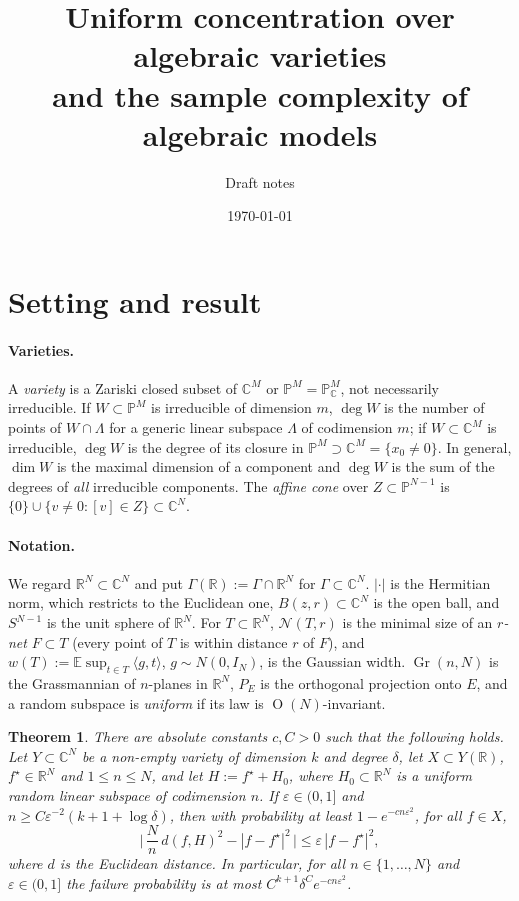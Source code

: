 \documentclass[11pt]{article}
\title{Uniform concentration over algebraic varieties\\ and the sample complexity of algebraic models}
\author{Draft notes}
\date{\today}
\newtheorem{theorem}{Theorem}[section]
\newcommand{\R}{\mathbb{R}}
\newcommand{\C}{\mathbb{C}}
\newcommand{\PP}{\mathbb{P}}
\newcommand{\E}{\mathbb{E}}
\newcommand{\eps}{\varepsilon}
\newcommand{\fs}{f^{\star}}
\newcommand{\cN}{\mathcal{N}}
\DeclareMathOperator{\Gr}{Gr}
\DeclareMathOperator{\Ort}{O}
\begin{document}
\maketitle

\section{Setting and result}

\paragraph{Varieties.} A \emph{variety} is a Zariski closed subset of $\C^M$ or $\PP^M=\PP^M_\C$, not necessarily irreducible. If $W\subset\PP^M$ is irreducible of dimension $m$, $\deg W$ is the number of points of $W\cap\Lambda$ for a generic linear subspace $\Lambda$ of codimension $m$; if $W\subset\C^M$ is irreducible, $\deg W$ is the degree of its closure in $\PP^M\supset\C^M=\{x_0\ne0\}$. In general, $\dim W$ is the maximal dimension of a component and $\deg W$ is the sum of the degrees of \emph{all} irreducible components. The \emph{affine cone} over $Z\subset\PP^{N-1}$ is $\{0\}\cup\{v\ne0:[v]\in Z\}\subset\C^N$.

\paragraph{Notation.} We regard $\R^N\subset\C^N$ and put $\Gamma(\R):=\Gamma\cap\R^N$ for $\Gamma\subset\C^N$. $|\cdot|$ is the Hermitian norm, which restricts to the Euclidean one, $B(z,r)\subset\C^N$ is the open ball, and $S^{N-1}$ is the unit sphere of $\R^N$. For $T\subset\R^N$, $\cN(T,r)$ is the minimal size of an \emph{$r$-net} $F\subset T$ (every point of $T$ is within distance $r$ of $F$), and $w(T):=\E\sup_{t\in T}\langle g,t\rangle$, $g\sim N(0,I_N)$, is the Gaussian width. $\Gr(n,N)$ is the Grassmannian of $n$-planes in $\R^N$, $P_E$ is the orthogonal projection onto $E$, and a random subspace is \emph{uniform} if its law is $\Ort(N)$-invariant.

\begin{theorem}\label{thm:haar}
There are absolute constants $c,C>0$ such that the following holds. Let $Y\subset\C^N$ be a non-empty variety of dimension $k$ and degree $\delta$, let $X\subset Y(\R)$, $\fs\in\R^N$ and $1\le n\le N$, and let $H:=\fs+H_0$, where $H_0\subset\R^N$ is a uniform random linear subspace of codimension $n$. If $\eps\in(0,1]$ and $n\ge C\eps^{-2}(k+1+\log\delta)$, then with probability at least $1-e^{-cn\eps^2}$, for all $f\in X$,
\[
\Big|\,\frac Nn\,d(f,H)^2-|f-\fs|^2\,\Big|\le\eps\,|f-\fs|^2,
\]
where $d$ is the Euclidean distance. In particular, for all $n\in\{1,\dots,N\}$ and $\eps\in(0,1]$ the failure probability is at most $C^{k+1}\delta^Ce^{-cn\eps^2}$.
\end{theorem}
\end{document}
